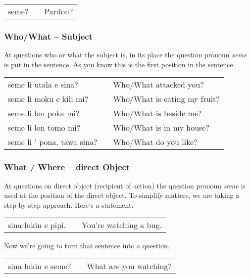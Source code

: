 \begin{supertabular}{p{5,5cm}|ll}
    seme? &  & Pardon? \\
\end{supertabular}
%
\subsubsection*{Who/What -- Subject}
%
At questions who or what the subject is, in its place the question pronoun \textit{seme} is put in the sentence.
As you know this is the first position in the sentence.

\begin{supertabular}{p{5,5cm}|ll}
    seme li utala e sina?      &  & Who/What attacked you?       \\
    seme li moku e kili mi?    &  & Who/What is eating my fruit? \\
    seme li lon poka mi?       &  & Who/What is beside me?       \\
    seme li lon tomo mi?       &  & Who/What is in my house?     \\
    seme li ' pona, tawa sina? &  & Who/What do you like?        \\
\end{supertabular}
%
\subsubsection*{What / Where -- direct Object}
%
%
At questions on direct object (recipient of action) the question pronoun \textit{seme} is used at the position of the direct object.
To simplify matters, we are taking a step-by-step approach.
Here's a statement:

\begin{supertabular}{p{5,5cm}|ll}
    sina lukin e pipi. &  & You're watching a bug. \\
\end{supertabular}

Now we're going to turn that sentence into a question.

\begin{supertabular}{p{5,5cm}|ll}
    sina lukin e seme? &  & What are you watching? \\
\end{supertabular}

